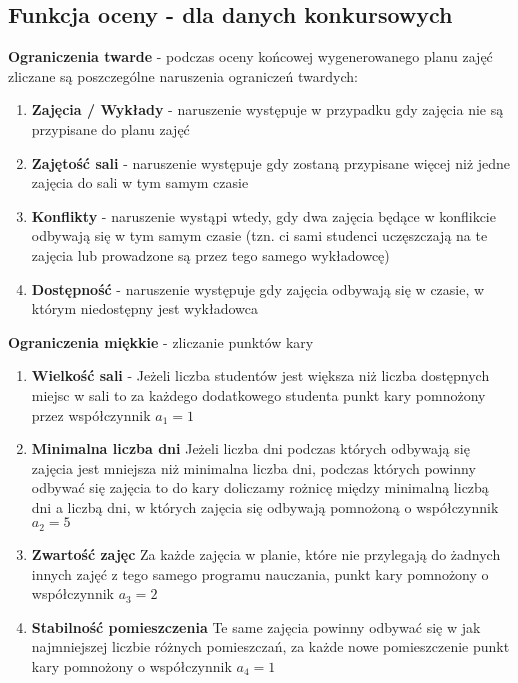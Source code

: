 \subsection{Funkcja oceny - dla danych konkursowych}
\textbf{Ograniczenia twarde} - podczas oceny końcowej wygenerowanego planu zajęć zliczane są poszczególne naruszenia ograniczeń twardych:\\
\begin{enumerate}
\item \textbf{Zajęcia / Wykłady} - naruszenie występuje w przypadku gdy zajęcia nie są przypisane do planu zajęć
\item \textbf{Zajętość sali} - naruszenie występuje gdy zostaną przypisane więcej niż jedne zajęcia do sali w tym samym czasie
\item \textbf{Konflikty} - naruszenie wystąpi wtedy, gdy dwa zajęcia będące w konflikcie odbywają się w tym samym czasie (tzn. ci sami studenci uczęszczają na te zajęcia lub prowadzone są przez tego samego wykładowcę)
\item \textbf{Dostępność} - naruszenie występuje gdy zajęcia odbywają się w czasie, w którym niedostępny jest wykładowca 
\end{enumerate} 

\textbf{Ograniczenia miękkie} - zliczanie punktów kary
\begin{enumerate}
\item \textbf{Wielkość sali} - Jeżeli liczba studentów jest większa niż liczba dostępnych miejsc w sali to za każdego dodatkowego studenta punkt kary pomnożony przez współczynnik ${a_{1} = 1}$ 
\item \textbf{Minimalna liczba dni}
Jeżeli liczba dni podczas których odbywają się zajęcia jest mniejsza niż minimalna liczba dni, podczas których powinny odbywać się zajęcia to do kary doliczamy rożnicę między minimalną liczbą dni a liczbą dni, w których zajęcia się odbywają pomnożoną o współczynnik $a_{2} = 5$ 
\item \textbf{Zwartość zajęc}
Za każde zajęcia w planie, które nie przylegają do żadnych innych zajęć z tego samego programu nauczania, punkt kary pomnożony o współczynnik ${a_{3} = 2}$
\item \textbf{Stabilność pomieszczenia}
Te same zajęcia powinny odbywać się w jak najmniejszej liczbie różnych pomieszczań, za każde nowe pomieszczenie punkt kary pomnożony o współczynnik ${a_{4} = 1}$
\end{enumerate}

